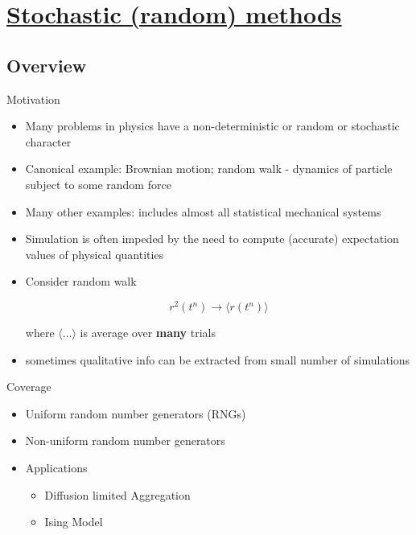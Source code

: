 \def \secname {Stochastic (random) methods}

\section[\secname]{\hyperlink{toc}{\secname}}



\subsection{Overview}

Motivation

\begin{itemize}
    \item Many problems in physics have a non-deterministic or random or stochastic character

    \item Canonical example: Brownian motion; random walk - dynamics of particle subject to some random force

    \item Many other examples: includes almost all statistical mechanical systems

    \item Simulation is often impeded by the need to compute (accurate) expectation values of physical quantities

    \item Consider random walk

    \[ r^2(t^n) \rightarrow \langle r(t^n) \rangle\]

    where $\langle \ldots \rangle$ is average over \textbf{many} trials

    \item sometimes qualitative info can be extracted from small number of simulations
\end{itemize}

Coverage

\begin{itemize}
    \item Uniform random number generators (RNGs)
    \item Non-uniform random number generators
    \item Applications
    \begin{itemize}
        \item Diffusion limited Aggregation
        \item Ising Model
    \end{itemize}
\end{itemize}

